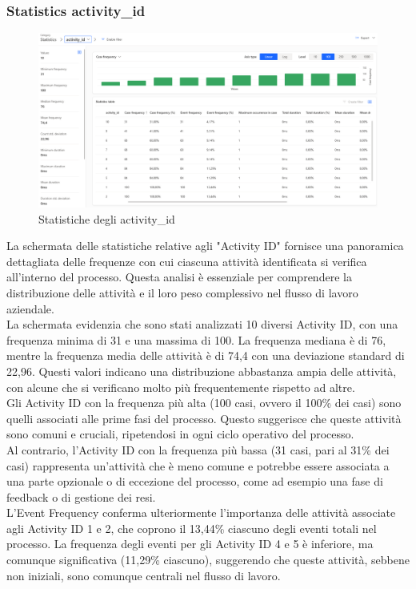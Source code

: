 \documentclass{article}
\begin{document}
\subsubsection{Statistics activity\_id}
\begin{figure}[H]
    \centering
    \includegraphics[width=\textwidth]{imgMicrosoft/PrimaSimulazione/StatisticsActivityIdSimulazione1.png}
    \caption{Statistiche degli activity\_id}
    \label{fig:statistics-activity_id}
\end{figure}
La schermata delle statistiche relative agli "Activity ID" fornisce una panoramica dettagliata delle frequenze con cui ciascuna attività identificata si verifica all'interno del processo. Questa analisi è essenziale per comprendere la distribuzione delle attività e il loro peso complessivo nel flusso di lavoro aziendale.\\
La schermata evidenzia che sono stati analizzati 10 diversi Activity ID, con una frequenza minima di 31 e una massima di 100. La frequenza mediana è di 76, mentre la frequenza media delle attività è di 74,4 con una deviazione standard di 22,96. Questi valori indicano una distribuzione abbastanza ampia delle attività, con alcune che si verificano molto più frequentemente rispetto ad altre.\\
Gli Activity ID con la frequenza più alta (100 casi, ovvero il 100\% dei casi) sono quelli associati alle prime fasi del processo. Questo suggerisce che queste attività sono comuni e cruciali, ripetendosi in ogni ciclo operativo del processo.\\
Al contrario, l'Activity ID con la frequenza più bassa (31 casi, pari al 31\% dei casi) rappresenta un'attività che è meno comune e potrebbe essere associata a una parte opzionale o di eccezione del processo, come ad esempio una fase di feedback o di gestione dei resi.\\
L'Event Frequency conferma ulteriormente l'importanza delle attività associate agli Activity ID 1 e 2, che coprono il 13,44\% ciascuno degli eventi totali nel processo. La frequenza degli eventi per gli Activity ID 4 e 5 è inferiore, ma comunque significativa (11,29\% ciascuno), suggerendo che queste attività, sebbene non iniziali, sono comunque centrali nel flusso di lavoro.\\
\end{document}
